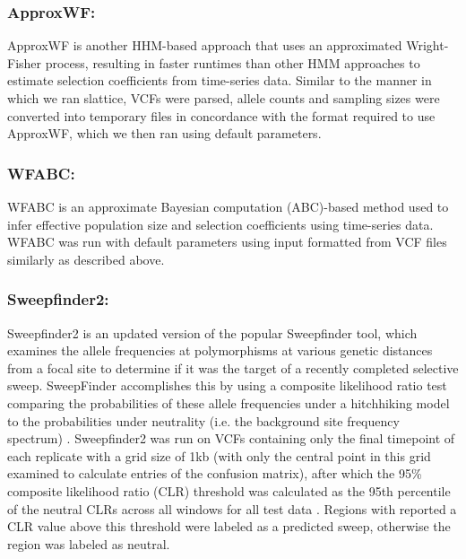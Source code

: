 \subsubsection{ApproxWF: } ApproxWF \cite{ferrer-admetllaApproximateMarkovModel2016} is another HHM-based approach that uses an approximated Wright-Fisher process, resulting in faster runtimes than other HMM approaches to estimate selection coefficients from time-series data. Similar to the manner in which we ran slattice, VCFs were parsed, allele counts and sampling sizes were converted into temporary files in concordance with the format required to use ApproxWF, which we then ran using default parameters.

 \subsubsection{WFABC: } WFABC \cite{follWFABCWrightFisher2015} is an approximate Bayesian computation (ABC)-based method used to infer effective population size and selection coefficients using time-series data. WFABC was run with default parameters using input formatted from VCF files similarly as described above. 

\subsubsection{Sweepfinder2: } Sweepfinder2 \cite{degiorgioSweepFinder2IncreasedSensitivity2016} is an updated version of the popular Sweepfinder \cite{nielsenGenomicScansSelective2005} tool, which examines the allele frequencies at polymorphisms at various genetic distances from a focal site to determine if it was the target of a recently completed selective sweep. SweepFinder accomplishes this by using a composite likelihood ratio test comparing the probabilities of these allele frequencies under a hitchhiking model to the probabilities under neutrality (i.e. the background site frequency spectrum) . Sweepfinder2 was run on VCFs containing only the final timepoint of each replicate with a grid size of 1kb (with only the central point in this grid examined to calculate entries of the confusion matrix), after which the 95\% composite likelihood ratio (CLR) threshold was calculated as the 95th percentile of the neutral CLRs across all windows for all test data . Regions with reported a CLR value above this threshold were labeled as a predicted sweep, otherwise the region was labeled as neutral.

